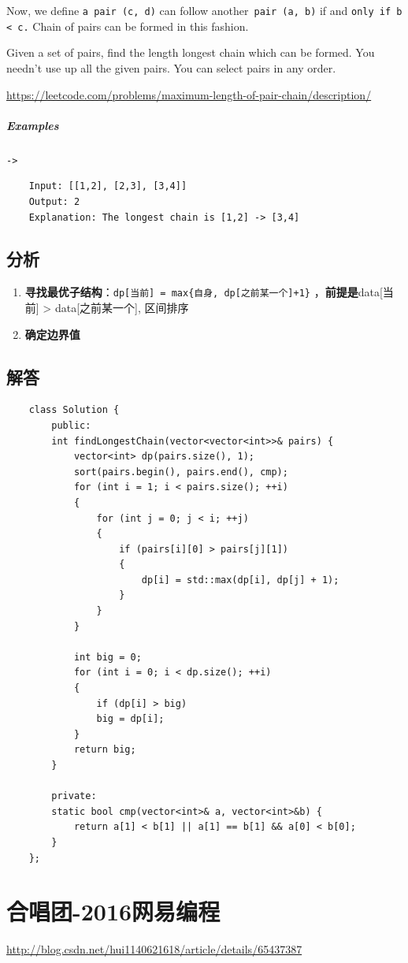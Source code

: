 \documentclass[UTF8,a4paper,12pt]{ctexbook}
\begin{document}
	Now, we define \verb|a pair (c, d)| can follow another\verb| pair (a, b)| if and \verb|only if b < c.| Chain of pairs can be formed in this fashion.
	
	Given a set of pairs, find the length longest chain which can be formed. You needn't use up all the given pairs. You can select pairs in any order.
	
	\url{https://leetcode.com/problems/maximum-length-of-pair-chain/description/}
	\subparagraph{Examples}\verb|->|
		\begin{lstlisting}
	Input: [[1,2], [2,3], [3,4]]
	Output: 2
	Explanation: The longest chain is [1,2] -> [3,4]
		\end{lstlisting}
	\subsection{分析}
		
		\begin{enumerate}[itemindent = 2em]
			\item \textbf{寻找最优子结构}：\verb|dp[当前] = max{自身, dp[之前某一个]+1}| ，\textbf{前提是}data[当前] > data[之前某一个], 区间排序
			\item \textbf{确定边界值}
		\end{enumerate}
		
	\subsection{解答}
		\begin{lstlisting}
	class Solution {
		public:
		int findLongestChain(vector<vector<int>>& pairs) {
			vector<int> dp(pairs.size(), 1);
			sort(pairs.begin(), pairs.end(), cmp);
			for (int i = 1; i < pairs.size(); ++i)
			{
				for (int j = 0; j < i; ++j)
				{
					if (pairs[i][0] > pairs[j][1])
					{
						dp[i] = std::max(dp[i], dp[j] + 1);
					}
				}
			}
			
			int big = 0;
			for (int i = 0; i < dp.size(); ++i)
			{
				if (dp[i] > big)
				big = dp[i];
			}
			return big;
		}
		
		private:
		static bool cmp(vector<int>& a, vector<int>&b) {
			return a[1] < b[1] || a[1] == b[1] && a[0] < b[0];
		}
	};
		\end{lstlisting}
\section{合唱团-2016网易编程}
	\url{http://blog.csdn.net/hui1140621618/article/details/65437387}
	
\end{document}

